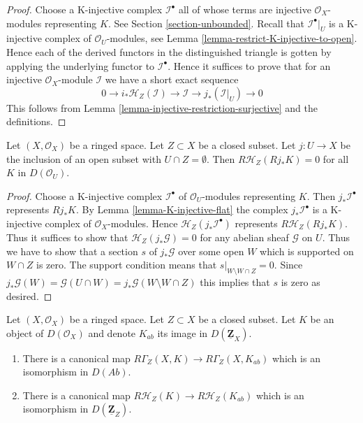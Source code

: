 \begin{proof}
Choose a K-injective complex $\mathcal{I}^\bullet$ all of whose terms
are injective $\mathcal{O}_X$-modules representing $K$. See
Section \ref{section-unbounded}. Recall that $\mathcal{I}^\bullet|_U$
is a K-injective complex of $\mathcal{O}_U$-modules, see
Lemma \ref{lemma-restrict-K-injective-to-open}. Hence each
of the derived functors in the distinguished triangle is gotten
by applying the underlying functor to $\mathcal{I}^\bullet$.
Hence it suffices to prove that
for an injective $\mathcal{O}_X$-module $\mathcal{I}$ we have
a short exact sequence
$$
0 \to i_*\mathcal{H}_Z(\mathcal{I}) \to \mathcal{I}
\to j_*(\mathcal{I}|_U) \to 0
$$
This follows from Lemma \ref{lemma-injective-restriction-surjective}
and the definitions.
\end{proof}

\begin{lemma}
\label{lemma-sections-support-in-closed-disjoint-open}
Let $(X, \mathcal{O}_X)$ be a ringed space. Let $Z \subset X$
be a closed subset. Let $j : U \to X$ be the inclusion of
an open subset with $U \cap Z = \emptyset$. Then
$R\mathcal{H}_Z(Rj_*K) = 0$ for all $K$ in $D(\mathcal{O}_U)$.
\end{lemma}

\begin{proof}
Choose a K-injective complex $\mathcal{I}^\bullet$ of $\mathcal{O}_U$-modules
representing $K$. Then $j_*\mathcal{I}^\bullet$ represents $Rj_*K$. By
Lemma \ref{lemma-K-injective-flat} the complex $j_*\mathcal{I}^\bullet$ is a
K-injective complex of $\mathcal{O}_X$-modules. Hence
$\mathcal{H}_Z(j_*\mathcal{I}^\bullet)$ represents $R\mathcal{H}_Z(Rj_*K)$.
Thus it suffices to show that $\mathcal{H}_Z(j_*\mathcal{G}) = 0$
for any abelian sheaf $\mathcal{G}$ on $U$. Thus we have to show that
a section $s$ of $j_*\mathcal{G}$ over some open $W$ which is supported
on $W \cap Z$ is zero. The support condition means that
$s|_{W \setminus W \cap Z} = 0$. Since $j_*\mathcal{G}(W) =
\mathcal{G}(U \cap W) = j_*\mathcal{G}(W \setminus W \cap Z)$
this implies that $s$ is zero as desired.
\end{proof}

\begin{lemma}
\label{lemma-sections-support-abelian-unbounded}
Let $(X, \mathcal{O}_X)$ be a ringed space. Let $Z \subset X$
be a closed subset. Let $K$ be an object of $D(\mathcal{O}_X)$
and denote $K_{ab}$ its image in $D(\underline{\mathbf{Z}}_X)$.
\begin{enumerate}
\item There is a canonical map $R\Gamma_Z(X, K) \to R\Gamma_Z(X, K_{ab})$
which is an isomorphism in $D(\textit{Ab})$.
\item There is a canonical map
$R\mathcal{H}_Z(K) \to R\mathcal{H}_Z(K_{ab})$
which is an isomorphism in $D(\underline{\mathbf{Z}}_Z)$.
\end{enumerate}
\end{lemma}

